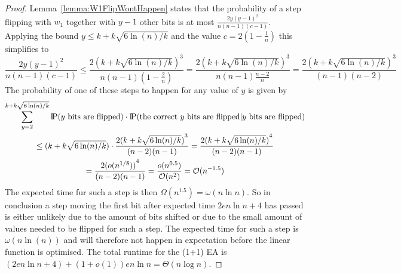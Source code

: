 \begin{proof}
      Lemma~\ref{lemma:W1FlipWontHappen} states that the probability of a step flipping with $w_1$ together with $y-1$ other bits is at most $\frac{2y{(y-1)}^2}{n(n-1)(c-1)}$.
      Applying the bound $y\le k+k\sqrt{6\ln(n)/k}$ and the value $c=2(1-\frac{1}{n})$ this simplifies to
      \[
            \frac{2y{(y-1)}^2}{n(n-1)(c-1)}
            \le\frac{2{(k+k\sqrt{6\ln(n)/k})}^3}{n(n-1)(1-\frac{2}{n})}
            =\frac{2{(k+k\sqrt{6\ln(n)/k})}^3}{n(n-1)\frac{n-2}{n}}
            =\frac{2{(k+k\sqrt{6\ln(n)/k})}^3}{(n-1)(n-2)}
      \]
      The probability of one of these steps to happen for any value of $y$ is given by
      \begin{gather}
            \nonumber \sum_{y=2}^{k+k\sqrt{6\ln(n)/k}}{\text{I\kern-0.15em P}(y \text{ bits are flipped})\cdot\text{I\kern-0.15em P}(\text{the correct $y$ bits are flipped} | y \text{ bits are flipped})}\\
            \nonumber \le ({k+k\sqrt{6\ln(n)/k}})\cdot\frac{2{(k+k\sqrt{6\ln(n)/k})}^{3}}{(n-2)(n-1)}
            = \frac{2{(k+k\sqrt{6\ln(n)/k})}^{4}}{(n-2)(n-1)}\\ \nonumber
            = \frac{2{(o({n}^{1/8}))}^{4}}{(n-2)(n-1)}
            = \frac{o(n^{0.5})}{\mathcal{O}(n^{2})}
            = \mathcal{O}(n^{-1.5})
      \end{gather}
      The expected time fur such a step is then $\Omega(n^{1.5})=\omega(n\ln n)$.
      So in conclusion a step moving the first bit after expected time $2en\ln n+4$ has passed is either unlikely due to the amount of bits shifted or due to the small amount of values needed to be flipped for such a step.
      The expected time for such a step is $\omega(n\ln(n))$ and will therefore not happen in expectation before the linear function is optimised.
      The total runtime for the (1+1) EA is $(2en\ln n+4) + (1+o(1))en\ln n = \Theta(n\log{}n)$.
\end{proof}